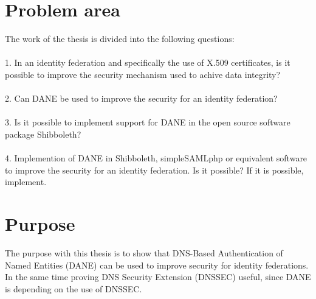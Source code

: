 
\section{Problem area}
The work of the thesis is divided into the following questions:
\\\\
1. In an identity federation and specifically the use of X.509 certificates,
is it possible to improve the security mechanism used to achive data integrity?
\\\\
2. Can DANE be used to improve the security for an identity federation? 
\\\\
3. Is it possible to implement support for DANE in the open source software package Shibboleth? 
\\\\
4. Implemention of DANE in Shibboleth, simpleSAMLphp or equivalent software to improve the security for an identity federation. Is it possible?
If it is possible, implement.


\section{Purpose}
The purpose with this thesis is to show that DNS-Based Authentication of Named Entities (DANE) \cite{rfc:6394,rfc:draft-dane,rfc:draft-smime} can be used to improve security for identity federations.
In the same time proving DNS Security Extension (DNSSEC) \cite{rfc:4033,rfc:4034,rfc:4035,rfc:5011} useful, since DANE is 
depending on the use of DNSSEC.

